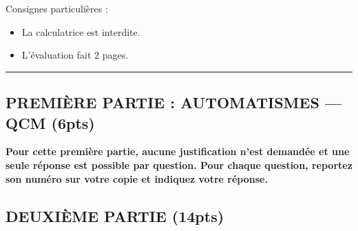 

\SetDate[17/10/2025]
\reversemarginpar

\setlength{\marginparsep}{.5cm}

\renewcommand{\ExerciseHeader}{
	\textbf{Exercice \theExercise.}
	\ifnum\ExerciseDifficulty=0
	\else
		(\theExerciseDifficulty)
	\fi
}


\pagestyle{fancy}
\fancyhead[R]{\today}

\null\vspace{-30pt}
Consignes particulières : 
\begin{itemize}[label=$\bullet$]
	\item 
	La calculatrice est {interdite}.
	\item
	L'évaluation fait 2 pages.
\end{itemize}

\hrule

\begin{center}
\subsection*{PREMIÈRE PARTIE : AUTOMATISMES — QCM (6pts)}
\end{center}

\textbf{
	Pour cette première partie, aucune justification n'est demandée et une seule réponse est possible par question.
	Pour chaque question, reportez son numéro sur votre copie et indiquez votre réponse.
}

\vspace{30pt}



\newpage

\begin{center}
\subsection*{DEUXIÈME PARTIE (14pts)}
\end{center}





\newpage
{}
\shipoutAnswer


